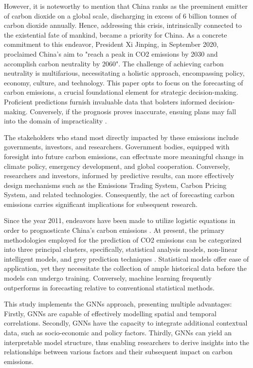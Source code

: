 \documentclass[sigconf, authordraft]{acmart}
\begin{document}
However, it is noteworthy to mention that China ranks as the preeminent
emitter of carbon dioxide on a global scale, discharging in excess of 6 billion
tonnes of carbon dioxide annually. Hence, addressing this crisis,
intrinsically connected to the existential fate of mankind, became a priority for
China. As a concrete commitment to this endeavor, President Xi Jinping, in
September 2020, proclaimed China's aim to "reach a peak in CO2 emissions by
2030 and accomplish carbon neutrality by 2060". The challenge of achieving
carbon neutrality is multifarious, necessitating a holistic approach,
encompassing policy, economy, culture, and technology. This paper opts to
focus on the forecasting of carbon emissions, a crucial foundational element for
strategic decision-making. Proficient predictions furnish invaluable data that
bolsters informed decision-making. Conversely, if the prognosis proves
inaccurate, ensuing plans may fall into the domain of impracticality \cite{-forecasting}.

The stakeholders who stand most directly impacted by these emissions include governments,
investors, and researchers. Government bodies, equipped with foresight into future
carbon emissions, can effectuate more meaningful change in climate policy, emergency
development, and global cooperation. Conversely, researchers and investors, informed
by predictive results, can more effectively design mechanisms such as the
Emissions Trading System, Carbon Pricing System, and related technologies. Consequently,
the act of forecasting carbon emissions carries significant implications for
subsequent research.

Since the year 2011, endeavors have been made to utilize logistic equations in
order to prognosticate China's carbon emissions \cite{meng2011-modeling}. At
present, the primary methodologies employed for the prediction of CO2 emissions
can be categorized into three principal clusters, specifically, statistical analysis
models, non-linear intelligent models, and grey prediction techniques \cite{gao2021-novel}.
Statistical models offer ease of application, yet they necessitate the collection
of ample historical data before the models can undergo training. Conversely, machine
learning frequently outperforms in forecasting relative to conventional statistical
methods.

This study implements the GNNs approach, presenting multiple advantages: Firstly,
GNNs are capable of effectively modelling spatial and temporal correlations. Secondly,
GNNs have the capacity to integrate additional contextual data, such as socio-economic
and policy factors. Thirdly, GNNs can yield an interpretable model structure,
thus enabling researchers to derive insights into the relationships between
various factors and their subsequent impact on carbon emissions\cite{alam2021-forecasting}.
\end{document}
